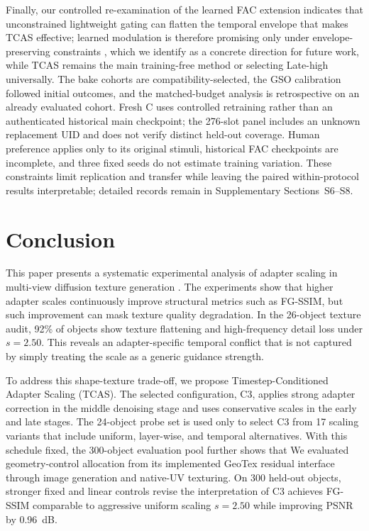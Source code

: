 \documentclass[times,twocolumn,final]{elsarticle}
\providecommand{\DIFadd}[1]{{\protect\color{blue} \sf #1}} %
\providecommand{\DIFdel}[1]{{\protect\color{red} \scriptsize #1}} %
\providecommand{\DIFaddbegin}{} %
\providecommand{\DIFaddend}{} %
\providecommand{\DIFdelbegin}{} %
\providecommand{\DIFdelend}{} %
\begin{document}
\DIFdel{Finally, our controlled re-examination of the learned FAC extension indicates that unconstrained lightweight gating can flatten the temporal envelope that makes TCAS effective; learned modulation is therefore promising only under envelope-preserving constraints , which we identify as a concrete direction for future work, while TCAS remains the main training-free method}\DIFdelend \DIFaddbegin \DIFadd{or selecting Late-high universally. The bake cohorts are compatibility-selected, the GSO calibration followed initial outcomes, and the matched-budget analysis is retrospective on an already evaluated cohort. Fresh C uses controlled retraining rather than an authenticated historical main checkpoint; the 276-slot panel includes an unknown replacement UID and does not verify distinct held-out coverage. Human preference applies only to its original stimuli, historical FAC checkpoints are incomplete, and three fixed seeds do not estimate training variation. These constraints limit replication and transfer while leaving the paired within-protocol results interpretable; detailed records remain in Supplementary Sections~S6--S8}\DIFaddend .

\section{Conclusion}
\label{sec:conclusion}

\DIFdelbegin \DIFdel{This paper presents a systematic experimental analysis of adapter scaling in multi-view diffusion texture generation . The experiments show that higher adapter scales continuously improve structural metrics such as FG-SSIM, but such improvement can mask texture quality degradation. In the 26-object texture audit, 92\% of objects show texture flattening and high-frequency detail loss under $s = 2.50$. This reveals an adapter-specific temporal conflict that is not captured by simply treating the scale as a generic guidance strength.
}%

\DIFdel{To address this shape-texture trade-off, we propose Timestep-Conditioned Adapter Scaling (TCAS). The selected configuration, C3, applies strong adapter correction in the middle denoising stage and uses conservative scales in the early and late stages. The 24-object probe set is used only to select C3 from 17 scaling variants that include uniform, layer-wise, and temporal alternatives. With this schedule fixed, the 300-object evaluation pool further shows that }\DIFdelend \DIFaddbegin \DIFadd{We evaluated geometry-control allocation from its implemented GeoTex residual interface through image generation and native-UV texturing. On 300 held-out objects, stronger fixed and linear controls revise the interpretation of }\DIFaddend C3\DIFdelbegin \DIFdel{achieves FG-SSIM comparable to aggressive uniform scaling $s = 2.50$ while improving PSNR by 0.96~dB. }%
\end{document}
